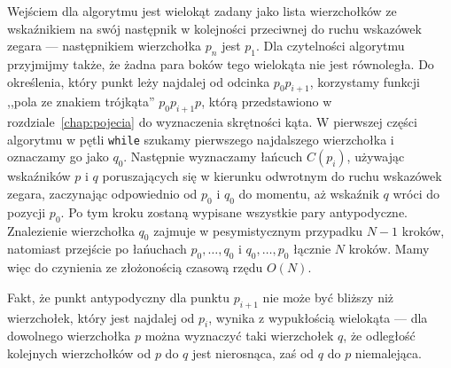 Wejściem dla algorytmu jest wielokąt zadany jako lista wierzchołków ze
wskaźnikiem na swój następnik w kolejności przeciwnej do ruchu
wskazówek zegara --- następnikiem wierzchołka $p_n$ jest $p_1$. Dla
czytelności algorytmu przyjmijmy także, że żadna para boków tego
wielokąta nie jest równoległa. Do określenia, który punkt leży
najdalej od odcinka $p_{0}p_{i+1}$, korzystamy funkcji ,,pola ze
znakiem trójkąta'' $p_{0}p_{i+1}p$, którą przedstawiono w
rozdziale~\ref{chap:pojecia} do wyznaczenia skrętności kąta. W
pierwszej części algorytmu w pętli \texttt{while} szukamy pierwszego
najdalszego wierzchołka i oznaczamy go jako $q_0$. Następnie
wyznaczamy łańcuch $C(p_i)$, używając wskaźników $p$ i $q$
poruszających się w kierunku odwrotnym do ruchu wskazówek zegara,
zaczynając odpowiednio od $p_0$ i $q_0$ do momentu, aż wskaźnik $q$
wróci do pozycji $p_0$. Po tym kroku zostaną wypisane wszystkie pary
antypodyczne. Znalezienie wierzchołka $q_0$ zajmuje w pesymistycznym
przypadku $N-1$ kroków, natomiast przejście po łańuchach $p_{0},
\ldots, q_{0}$ i $q_{0}, \ldots, p_{0}$ łącznie $N$ kroków. Mamy więc
do czynienia ze złożonością czasową rzędu $O(N)$.



Fakt, że punkt antypodyczny dla punktu $p_{i+1}$ nie może być bliższy
niż wierzchołek, który jest najdalej od $p_i$, wynika z wypukłością
wielokąta --- dla dowolnego wierzchołka $p$ można wyznaczyć taki
wierzchołek $q$, że odległość kolejnych wierzchołków od $p$ do $q$
jest nierosnąca, zaś od $q$ do $p$ niemalejąca.

